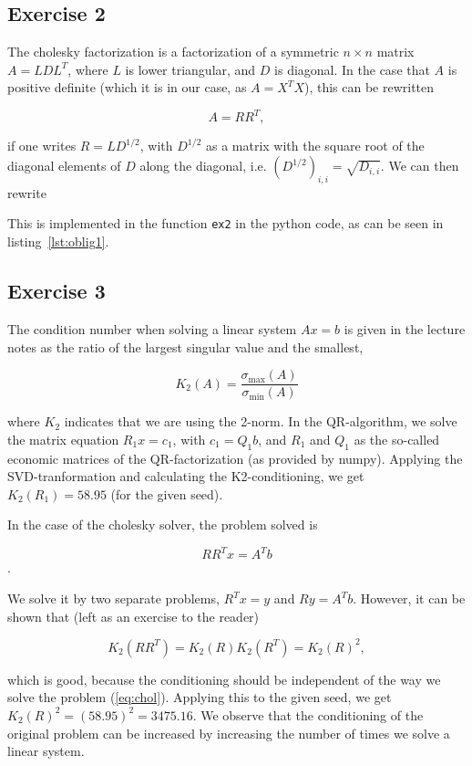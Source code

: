 \documentclass[a11paper, 10pt]{article}
\begin{document}
\subsection*{Exercise 2}
The cholesky factorization is a factorization of a symmetric $n\times n$
matrix $A = LDL^T$, where $L$ is lower triangular, and $D$ is diagonal. In the case that $A$ is positive definite (which it
is in our case, as $A = X^TX$), this can be rewritten 

\begin{equation}
    A = RR^T,
\end{equation}

if one writes $R = L D^{1/2}$, with $D^{1/2}$ as a matrix with the square
root of the diagonal elements of $D$ along the diagonal, i.e.
$(D^{1/2})_{i,i}  = \sqrt{D_{i,i}}$. We can then rewrite 

This is implemented in the function \texttt{ex2} in the python code, as
can be seen in listing~\ref{lst:oblig1}. 

\subsection*{Exercise 3}


The condition number when solving a linear system $Ax = b$ is given in the lecture
notes as the ratio of the largest singular value and the smallest,

\begin{equation}
    K_2(A) = \frac{\sigma_{\text{max}}
    (A)}{\sigma_{\text{min}}(A)}
\end{equation}

where $K_2$ indicates that we are using the 2-norm. In the QR-algorithm,
we solve the matrix equation $R_1x = c_1$, with $c_1 = Q_1 b$, and $R_1$
and $Q_1$ as the so-called economic matrices of the QR-factorization (as
provided by numpy). Applying the SVD-tranformation and calculating the K2-conditioning, we
get $K_2(R_1) = 58.95$ (for the given seed).

In the case of the cholesky solver, the problem solved is 

\begin{equation}
    RR^T x = A^T b
\end{equation}.

We solve it by two separate problems, $R^T x = y$ and $Ry = A^Tb$. However,
it can be shown that (left as an exercise to the reader)

\begin{equation}\label{eq:chol}
    K_2(RR^T) = K_2(R) K_2(R^T) = K_2(R)^2,
\end{equation}

which is good, because the conditioning should be independent of the way we
solve the problem (\cref{eq:chol}). Applying this to the given seed, we get
$K_2(R)^2 = (58.95)^2 = 3475.16$. We observe that the conditioning of the
original problem can be increased by increasing the number of times we
solve a linear system. 




\end{document}
